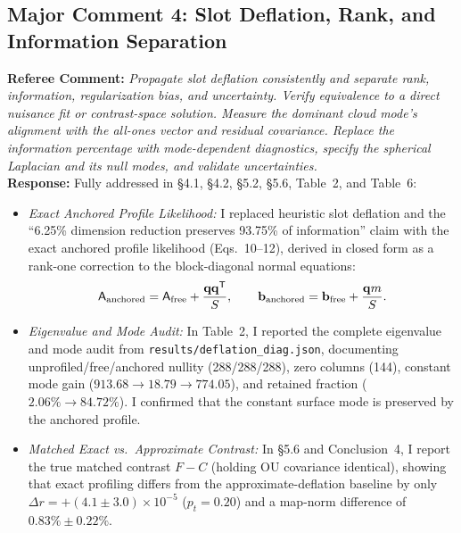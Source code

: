 \documentclass[11pt]{article}
\begin{document}
\subsection*{Major Comment 4: Slot Deflation, Rank, and Information Separation}
\textbf{Referee Comment:} \textit{Propagate slot deflation consistently and separate rank, information, regularization bias, and uncertainty. Verify equivalence to a direct nuisance fit or contrast-space solution. Measure the dominant cloud mode's alignment with the all-ones vector and residual covariance. Replace the information percentage with mode-dependent diagnostics, specify the spherical Laplacian and its null modes, and validate uncertainties.}\\
\textbf{Response:} Fully addressed in §4.1, §4.2, §5.2, §5.6, Table~2, and Table~6:
\begin{itemize}
    \item \textit{Exact Anchored Profile Likelihood:} I replaced heuristic slot deflation and the ``6.25\% dimension reduction preserves 93.75\% of information'' claim with the exact anchored profile likelihood (Eqs.~10--12), derived in closed form as a rank-one correction to the block-diagonal normal equations:
    \begin{equation*}
        \mathsf{A}_{\rm anchored} = \mathsf{A}_{\rm free} + \frac{\mathbf{q}\mathbf{q}^{\sf T}}{S}, \qquad \mathbf{b}_{\rm anchored} = \mathbf{b}_{\rm free} + \frac{\mathbf{q}m}{S}.
    \end{equation*}
    \item \textit{Eigenvalue and Mode Audit:} In Table~2, I reported the complete eigenvalue and mode audit from \texttt{results/deflation\_diag.json}, documenting unprofiled/free/anchored nullity (288/288/288), zero columns (144), constant mode gain ($913.68 \to 18.79 \to 774.05$), and retained fraction ($2.06\% \to 84.72\%$). I confirmed that the constant surface mode is preserved by the anchored profile.
    \item \textit{Matched Exact vs.\ Approximate Contrast:} In §5.6 and Conclusion~4, I report the true matched contrast $F - C$ (holding OU covariance identical), showing that exact profiling differs from the approximate-deflation baseline by only $\Delta r = +(4.1 \pm 3.0)\times 10^{-5}$ ($p_t = 0.20$) and a map-norm difference of $0.83\% \pm 0.22\%$.
\end{itemize}
\end{document}
